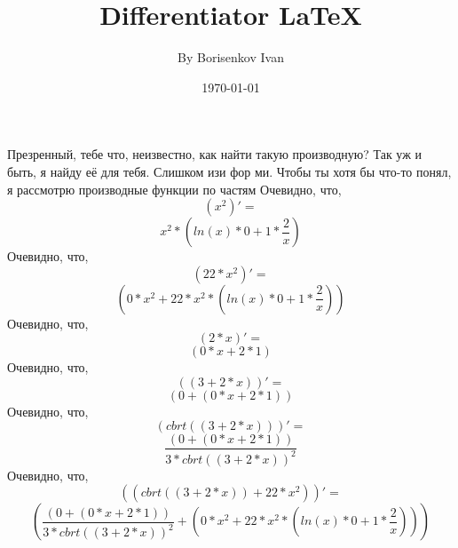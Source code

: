 \documentclass[a4paper,12pt]{article}
\author{By Borisenkov Ivan}
\title{Differentiator \LaTeX{}}
\date{\today}
\begin{document}
\maketitle
\newpage
Презренный, тебе что, неизвестно, как найти такую производную?
Так уж и быть, я найду её для тебя. Слишком изи фор ми.
Чтобы ты хотя бы что-то понял, я рассмотрю производные функции по частям
Очевидно, что,
\begin{equation}
\left( {x }^ {2 }\right)' =
\end{equation}
\begin{equation}
{{x }^ {2 }}* {\left( {{ln \left( {x }\right) }* {0 }}+ {{1 }* {\frac{{2 }}{{x }}}}\right) }
\end{equation}
Очевидно, что,
\begin{equation}
\left( {22 }* {{x }^ {2 }}\right)' =
\end{equation}
\begin{equation}
\left( {{0 }* {{x }^ {2 }}}+ {{22 }* {{{x }^ {2 }}* {\left( {{ln \left( {x }\right) }* {0 }}+ {{1 }* {\frac{{2 }}{{x }}}}\right) }}}\right) 
\end{equation}
Очевидно, что,
\begin{equation}
\left( {2 }* {x }\right)' =
\end{equation}
\begin{equation}
\left( {{0 }* {x }}+ {{2 }* {1 }}\right) 
\end{equation}
Очевидно, что,
\begin{equation}
\left( \left( {3 }+ {{2 }* {x }}\right) \right)' =
\end{equation}
\begin{equation}
\left( {0 }+ {\left( {{0 }* {x }}+ {{2 }* {1 }}\right) }\right) 
\end{equation}
Очевидно, что,
\begin{equation}
\left( cbrt \left( {\left( {3 }+ {{2 }* {x }}\right) }\right) \right)' =
\end{equation}
\begin{equation}
\frac{{\left( {0 }+ {\left( {{0 }* {x }}+ {{2 }* {1 }}\right) }\right) }}{{{3 }* {{cbrt \left( {\left( {3 }+ {{2 }* {x }}\right) }\right) }^ {2 }}}}
\end{equation}
Очевидно, что,
\begin{equation}
\left( \left( {cbrt \left( {\left( {3 }+ {{2 }* {x }}\right) }\right) }+ {{22 }* {{x }^ {2 }}}\right) \right)' =
\end{equation}
\begin{equation}
\left( {\frac{{\left( {0 }+ {\left( {{0 }* {x }}+ {{2 }* {1 }}\right) }\right) }}{{{3 }* {{cbrt \left( {\left( {3 }+ {{2 }* {x }}\right) }\right) }^ {2 }}}}}+ {\left( {{0 }* {{x }^ {2 }}}+ {{22 }* {{{x }^ {2 }}* {\left( {{ln \left( {x }\right) }* {0 }}+ {{1 }* {\frac{{2 }}{{x }}}}\right) }}}\right) }\right) 
\end{equation}
\end{document}
